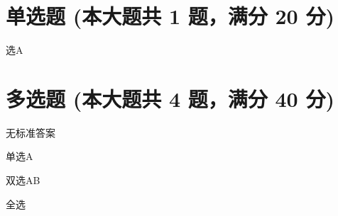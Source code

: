 \documentclass[12pt, a4paper, addpoints]{exam}
\begin{document}
\pagestyle{headandfoot}

\begin{center}
\end{center}
\vspace{5mm}

\normalsize
\vspace{5mm}

\section{\normalsize{单选题 (本大题共 1 题，满分 20 分)}}
\hspace{1.5cm}

\begin{questions}
\question[20] 选A

\begin{oneparchoices}
\end{oneparchoices}

\end{questions}

\hspace{5cm}

\section{\normalsize{多选题 (本大题共 4 题，满分 40 分)}}
\hspace{1.5cm}
\begin{multicols}{2}
\begin{questions}
\question[10] 无标准答案

\begin{checkboxes}
\end{checkboxes}

\question[10] 单选A

\begin{checkboxes}
\end{checkboxes}

\question[10] 双选AB

\begin{checkboxes}
\end{checkboxes}

\question[10] 全选

\begin{checkboxes}
\end{checkboxes}

\end{questions}
\end{multicols}
\end{document}
